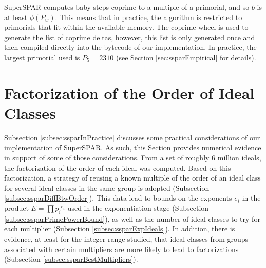 \documentclass{ucalgthes1}
\theoremstyle{definition}
\begin{document}
SuperSPAR computes baby steps coprime to a multiple of a primorial, and so $b$ is at least $\phi(P_w)$.  This means that in practice, the algorithm is restricted to primorials that fit within the available memory.  The coprime wheel is used to generate the list of coprime deltas, however, this list is only generated once and then compiled directly into the bytecode of our implementation.  In practice, the largest primorial used is $P_5 = 2310$ (see Section \ref{sec:ssparEmpirical} for details).

\section{Factorization of the Order of Ideal Classes}

Subsection \ref{subsec:ssparInPractice} discusses some practical considerations of our implementation of SuperSPAR.  As such, this Section provides numerical evidence in support of some of those considerations.  From a set of roughly 6 million ideals, the factorization of the order of each ideal was computed.  Based on this factorization, a strategy of reusing a known multiple of the order of an ideal class for several ideal classes in the same group is adopted (Subsection \ref{subsec:ssparDiffBtwOrder}).  This data lead to bounds on the exponents $e_i$ in the product $E = \prod {p_i}^{e_i}$ used in the exponentiation stage (Subsection \ref{subsec:ssparPrimePowerBound}), as well as the number of ideal classes to try for each multiplier (Subsection \ref{subsec:ssparExpIdeals}).  In addition, there is evidence, at least for the integer range studied, that ideal classes from groups associated with certain multipliers are more likely to lead to factorizations (Subsection \ref{subsec:ssparBestMultipliers}).
\end{document}
